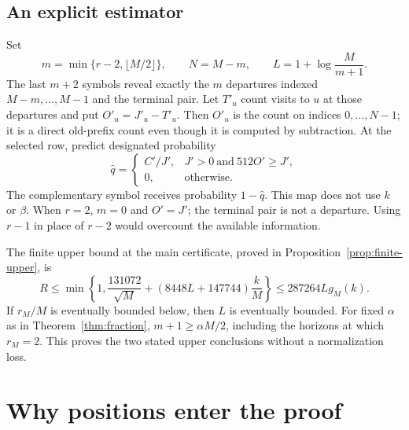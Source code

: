 \documentclass[11pt,letterpaper]{article}
\theoremstyle{definition}
\theoremstyle{remark}
\numberwithin{equation}{section}
\begin{document}
\subsection{An explicit estimator}
Set
\begin{equation}\label{eq:suffix-length}
 m=\min\{r-2,\lfloor M/2\rfloor\},\qquad N=M-m,\qquad
 L=1+\log\frac{M}{m+1}.
\end{equation}
The last $m+2$ symbols reveal exactly the $m$ departures indexed $M-m,\ldots,M-1$ and the terminal pair. Let $T'_u$ count visits to $u$ at those departures and put $O'_u=J'_u-T'_u$. Then $O'_u$ is the count on indices $0,\ldots,N-1$; it is a direct old-prefix count even though it is computed by subtraction. At the selected row, predict designated probability
\begin{equation}\label{eq:gate}
 \widehat q=
 \begin{cases}
 C'/J',& J'>0\ \text{and}\ 512O'\ge J',\\
 0,&\text{otherwise}.
 \end{cases}
\end{equation}
The complementary symbol receives probability $1-\widehat q$. This map does not use $k$ or $\beta$. When $r=2$, $m=0$ and $O'=J'$; the terminal pair is not a departure. Using $r-1$ in place of $r-2$ would overcount the available information.

The finite upper bound at the main certificate, proved in Proposition~\ref{prop:finite-upper}, is
\begin{equation}\label{eq:finite-upper}
 R\le\min\left\{1,\frac{131072}{\sqrt M}
 +(8448L+147744)\frac{k}{M}\right\}
 \le287264L g_M(k).
\end{equation}
If $r_M/M$ is eventually bounded below, then $L$ is eventually bounded. For fixed $\alpha$ as in Theorem~\ref{thm:fraction}, $m+1\ge\alpha M/2$, including the horizons at which $r_M=2$. This proves the two stated upper conclusions without a normalization loss.

\section{Why positions enter the proof}\label{sec:mechanisms}
\end{document}
